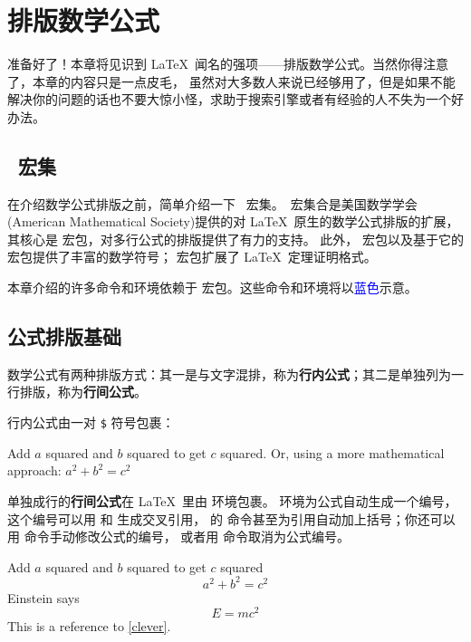 \chapter{排版数学公式}
\begin{intro}
准备好了！本章将见识到 \LaTeX\ 闻名的强项——排版数学公式。当然你得注意了，本章的内容只是一点皮毛，
虽然对大多数人来说已经够用了，但是如果不能解决你的问题的话也不要大惊小怪，求助于搜索引擎或者有经验的人不失为一个好办法。
\end{intro}
\DeclareRobustCommand*\amscmd[1]{\textcolor{blue}{\cmd{#1}}}
\DeclareRobustCommand*\amsenv[1]{\textcolor{blue}{\env{#1}}}

\section{\AmS\ 宏集}\label{sec:ams-bundle}

在介绍数学公式排版之前，简单介绍一下 \AmS\ 宏集。\AmS\ 宏集合是美国数学学会(American Mathematical Society)提供的对
\LaTeX\ 原生的数学公式排版的扩展，其核心是  宏包，对多行公式的排版提供了有力的支持。
此外， 宏包以及基于它的  宏包提供了丰富的数学符号； 宏包扩展了 \LaTeX\ 定理证明格式。

本章介绍的许多命令和环境依赖于  宏包。这些命令和环境将以\textcolor{blue}{蓝色}示意。

\section{公式排版基础}\label{sec:math-basics}

数学公式有两种排版方式：其一是与文字混排，称为\textbf{行内公式}；其二是单独列为一行排版，称为\textbf{行间公式}。

行内公式由一对 \texttt\$ 符号包裹：
\begin{example}
Add $a$ squared and $b$ squared
to get $c$ squared. Or, using
a more mathematical approach:
$a^2 + b^2 = c^2$
\end{example}

单独成行的\textbf{行间公式}在 \LaTeX\ 里由  环境包裹。
 环境为公式自动生成一个编号，这个编号可以用  和  生成交叉引用，
 的 \amscmd{eqref} 命令甚至为引用自动加上括号；你还可以用 \amscmd{tag} 命令手动修改公式的编号，
或者用 \amscmd{notag} 命令取消为公式编号。

\begin{example}
Add $a$ squared and $b$ squared
to get $c$ squared
\begin{equation}
a^2 + b^2 = c^2
\end{equation}
Einstein says
\begin{equation}
E = mc^2 \label{clever}
\end{equation}
This is a reference to
\eqref{clever}.
\end{example}


